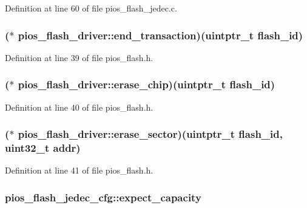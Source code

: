 Definition at line 60 of file pios\-\_\-flash\-\_\-jedec.\-c.

\hypertarget{group___p_i_o_s___f_l_a_s_h_ga775db43adcb0c42ede668aef36016301}{
\subsubsection[{end\-\_\-transaction}]{($\ast$ pios\-\_\-flash\-\_\-driver\-::end\-\_\-transaction)(uintptr\-\_\-t flash\-\_\-id)}}\label{group___p_i_o_s___f_l_a_s_h_ga775db43adcb0c42ede668aef36016301}


Definition at line 39 of file pios\-\_\-flash.\-h.

\hypertarget{group___p_i_o_s___f_l_a_s_h_ga38768b3295a563897e91191bfead95b5}{
\subsubsection[{erase\-\_\-chip}]{($\ast$ pios\-\_\-flash\-\_\-driver\-::erase\-\_\-chip)(uintptr\-\_\-t flash\-\_\-id)}}\label{group___p_i_o_s___f_l_a_s_h_ga38768b3295a563897e91191bfead95b5}


Definition at line 40 of file pios\-\_\-flash.\-h.

\hypertarget{group___p_i_o_s___f_l_a_s_h_ga91676d432517e3a2ea7303a07cd1bde3}{
\subsubsection[{erase\-\_\-sector}]{($\ast$ pios\-\_\-flash\-\_\-driver\-::erase\-\_\-sector)(uintptr\-\_\-t flash\-\_\-id, {\bf uint32\-\_\-t} {\bf addr})}}\label{group___p_i_o_s___f_l_a_s_h_ga91676d432517e3a2ea7303a07cd1bde3}


Definition at line 41 of file pios\-\_\-flash.\-h.

\hypertarget{group___p_i_o_s___f_l_a_s_h_ga33911ac74387cebdbc4bb2fe3d5541a6}{
\subsubsection[{expect\-\_\-capacity}]{ pios\-\_\-flash\-\_\-jedec\-\_\-cfg\-::expect\-\_\-capacity}}\label{group___p_i_o_s___f_l_a_s_h_ga33911ac74387cebdbc4bb2fe3d5541a6}


